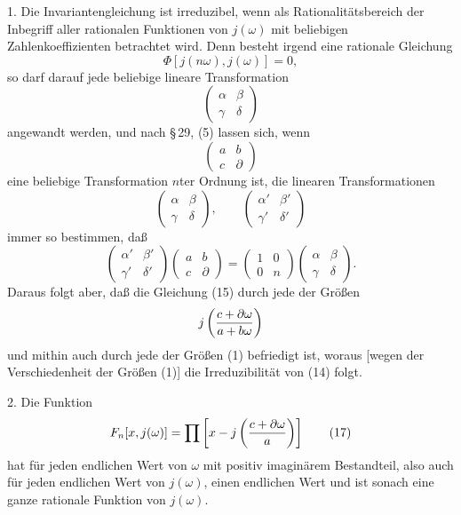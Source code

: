 \documentclass[11pt]{article}
\begin{document}
1. Die Invariantengleichung ist irreduzibel, wenn als Rationalitätsbereich der Inbegriff
aller rationalen Funktionen von $j(\omega)$ mit beliebigen Zahlenkoeffizienten betrachtet wird.
Denn besteht irgend eine rationale Gleichung
\begin{equation}
 \Phi[j(n\omega),j(\omega)]=0,
\tag{15}
\end{equation}
so darf darauf jede beliebige lineare Transformation
\[
 \begin{pmatrix}\alpha&\beta\\\gamma&\delta\end{pmatrix}
\]
angewandt werden, und nach \S\,29, (5) lassen sich, wenn
\[
 \begin{pmatrix}a&b\\c&\partial\end{pmatrix}
\]
eine beliebige Transformation $n$ter Ordnung ist, die linearen Transformationen
\[
 \begin{pmatrix}\alpha&\beta\\\gamma&\delta\end{pmatrix},
 \qquad
 \begin{pmatrix}\alpha'&\beta'\\\gamma'&\delta'\end{pmatrix}
\]
immer so bestimmen, daß
\begin{equation}
 \begin{pmatrix}\alpha'&\beta'\\\gamma'&\delta'\end{pmatrix}
 \begin{pmatrix}a&b\\c&\partial\end{pmatrix}
 =
 \begin{pmatrix}1&0\\0&n\end{pmatrix}
 \begin{pmatrix}\alpha&\beta\\\gamma&\delta\end{pmatrix}.
\tag{16}
\end{equation}
Daraus folgt aber, daß die Gleichung (15) durch jede der Größen
\[
 j\left({c+\partial\omega\over a+b\omega}\right)
\]
und mithin auch durch jede der Größen (1) befriedigt ist, woraus [wegen der Verschiedenheit
der Größen (1)] die Irreduzibilität von (14) folgt.

2. Die Funktion
\begin{equation}
 F_n[x,j(\omega)]=\prod\left[x-j\left({c+\partial\omega\over a}\right)\right]
\tag{17}
\end{equation}
hat für jeden endlichen Wert von $\omega$ mit positiv imaginärem Bestandteil, also auch für
jeden endlichen Wert von $j(\omega)$, einen endlichen Wert und ist sonach eine ganze rationale
Funktion von $j(\omega)$.
\end{document}

